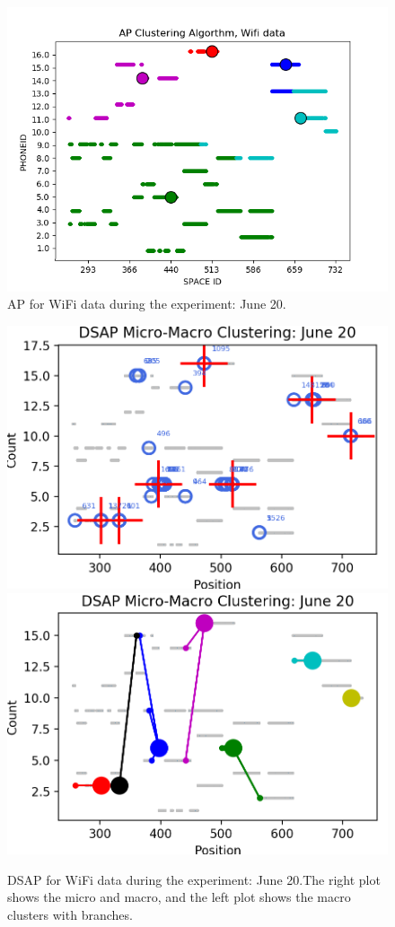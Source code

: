 \begin{figure}[!h]
    \centering
    \includegraphics[width = 10 cm]{image/Chapters/Chapter6/APJune20.png}
    \caption{ AP for WiFi data during the experiment: June 20.}
    \label{APUjoneday}
\end{figure}




\begin{figure}[!h]
    \centering
    \includegraphics[width=.48\textwidth]{image/Chapters/Chapter6/DSAPJune20.png}
    \includegraphics[width=.48\textwidth]{image/Chapters/Chapter6/DSAPJune20Macro.png}
    \\[\smallskipamount]    
    \caption{ DSAP for WiFi data during the experiment: June 20.The right plot shows the micro and macro, and the left plot shows the macro clusters with branches.}
    \label{dsapjun20}
\end{figure}




